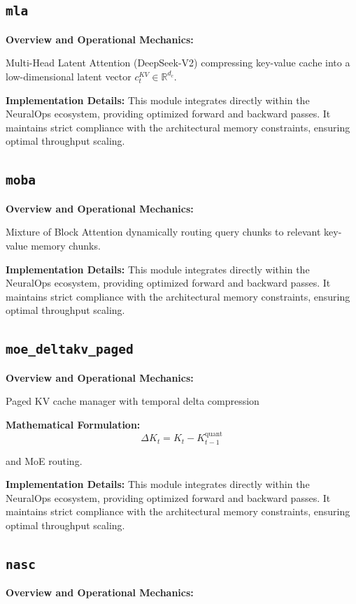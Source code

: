 \documentclass[10pt,twocolumn,letterpaper]{article}
\begin{document}
\subsection{\texttt{mla}}
\textbf{Overview and Operational Mechanics:}

Multi-Head Latent Attention (DeepSeek-V2) compressing key-value cache into a low-dimensional latent vector $c_t^{KV} \in \mathbb{R}^{d_c}$.

\textbf{Implementation Details:}
This module integrates directly within the NeuralOps ecosystem, providing optimized forward and backward passes. It maintains strict compliance with the architectural memory constraints, ensuring optimal throughput scaling.

\subsection{\texttt{moba}}
\textbf{Overview and Operational Mechanics:}

Mixture of Block Attention dynamically routing query chunks to relevant key-value memory chunks.

\textbf{Implementation Details:}
This module integrates directly within the NeuralOps ecosystem, providing optimized forward and backward passes. It maintains strict compliance with the architectural memory constraints, ensuring optimal throughput scaling.

\subsection{\texttt{moe\_deltakv\_paged}}
\textbf{Overview and Operational Mechanics:}

Paged KV cache manager with temporal delta compression

\textbf{Mathematical Formulation:}
\begin{equation}
\Delta K_t = K_t - K_{t-1}^{\text{quant}}
\end{equation}

and MoE routing.

\textbf{Implementation Details:}
This module integrates directly within the NeuralOps ecosystem, providing optimized forward and backward passes. It maintains strict compliance with the architectural memory constraints, ensuring optimal throughput scaling.

\subsection{\texttt{nasc}}
\textbf{Overview and Operational Mechanics:}
\end{document}

